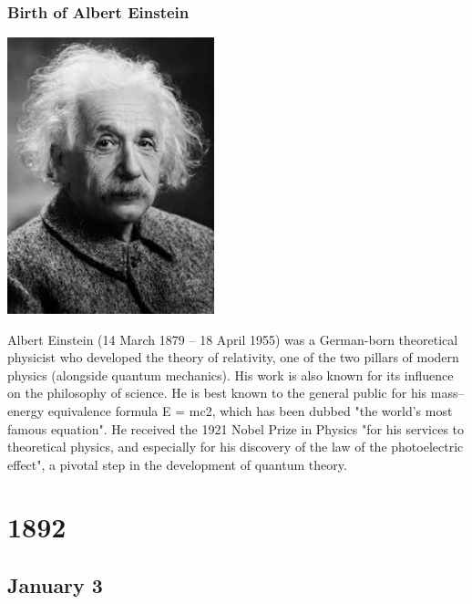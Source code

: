 \documentclass[11pt]{report}
\begin{document}
\subsection{Birth of Albert Einstein}
\vspace{2mm}\begin{center}\includegraphics[width=6cm]{./img/einstein.jpg}\end{center}
Albert Einstein (14 March 1879 – 18 April 1955) was a German-born theoretical physicist who developed the theory of relativity, one of the two pillars of modern physics (alongside quantum mechanics). His work is also known for its influence on the philosophy of science. He is best known to the general public for his mass–energy equivalence formula E = mc2, which has been dubbed "the world's most famous equation". He received the 1921 Nobel Prize in Physics "for his services to theoretical physics, and especially for his discovery of the law of the photoelectric effect", a pivotal step in the development of quantum theory.

\chapter{1892}
\section{January 3}
\end{document}
